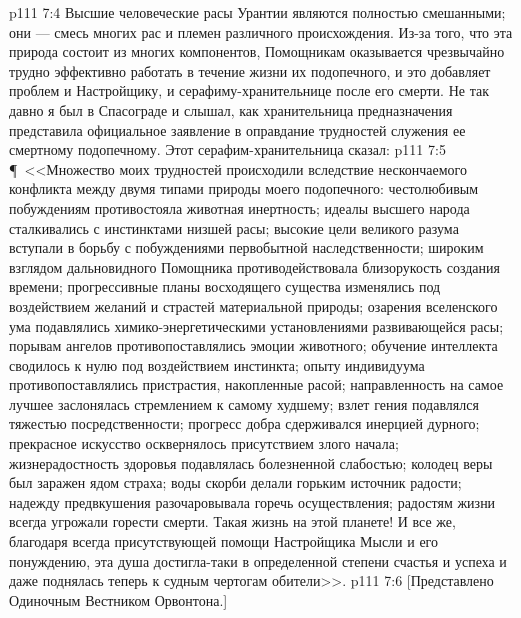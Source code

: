 \vs p111 7:4 Высшие человеческие расы Урантии являются полностью смешанными; они --- смесь многих рас и племен различного происхождения. Из\hyp{}за того, что эта природа состоит из многих компонентов, Помощникам оказывается чрезвычайно трудно эффективно работать в течение жизни их подопечного, и это добавляет проблем и Настройщику, и серафиму\hyp{}хранительнице после его смерти. Не так давно я был в Спасограде и слышал, как хранительница предназначения представила официальное заявление в оправдание трудностей служения ее смертному подопечному. Этот серафим\hyp{}хранительница сказал:
\vs p111 7:5 \P\ <<Множество моих трудностей происходили вследствие нескончаемого конфликта между двумя типами природы моего подопечного: честолюбивым побуждениям противостояла животная инертность; идеалы высшего народа сталкивались с инстинктами низшей расы; высокие цели великого разума вступали в борьбу с побуждениями первобытной наследственности; широким взглядом дальновидного Помощника противодействовала близорукость создания времени; прогрессивные планы восходящего существа изменялись под воздействием желаний и страстей материальной природы; озарения вселенского ума подавлялись химико\hyp{}энергетическими установлениями развивающейся расы; порывам ангелов противопоставлялись эмоции животного; обучение интеллекта сводилось к нулю под воздействием инстинкта; опыту индивидуума противопоставлялись пристрастия, накопленные расой; направленность на самое лучшее заслонялась стремлением к самому худшему; взлет гения подавлялся тяжестью посредственности; прогресс добра сдерживался инерцией дурного; прекрасное искусство осквернялось присутствием злого начала; жизнерадостность здоровья подавлялась болезненной слабостью; колодец веры был заражен ядом страха; воды скорби делали горьким источник радости; надежду предвкушения разочаровывала горечь осуществления; радостям жизни всегда угрожали горести смерти. Такая жизнь на этой планете! И все же, благодаря всегда присутствующей помощи Настройщика Мысли и его понуждению, эта душа достигла\hyp{}таки в определенной степени счастья и успеха и даже поднялась теперь к судным чертогам обители>>.
\vs p111 7:6 [Представлено Одиночным Вестником Орвонтона.]

